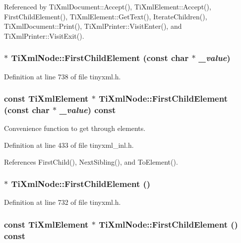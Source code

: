 Referenced by TiXmlDocument::Accept(), TiXmlElement::Accept(), FirstChildElement(), TiXmlElement::GetText(), IterateChildren(), TiXmlDocument::Print(), TiXmlPrinter::VisitEnter(), and TiXmlPrinter::VisitExit().\hypertarget{class_ti_xml_node_a6936ae323675071808ac4840379e57f5}{
\subsubsection[{FirstChildElement}]{$\ast$ TiXmlNode::FirstChildElement (const char $\ast$ {\em \_\-value})}}
\label{class_ti_xml_node_a6936ae323675071808ac4840379e57f5}


Definition at line 738 of file tinyxml.h.\hypertarget{class_ti_xml_node_a0ec361bfef1cf1978d060295f597e0d9}{
\subsubsection[{FirstChildElement}]{\setlength{\rightskip}{0pt plus 5cm}const {\bf TiXmlElement} $\ast$ TiXmlNode::FirstChildElement (const char $\ast$ {\em \_\-value}) const}}
\label{class_ti_xml_node_a0ec361bfef1cf1978d060295f597e0d9}


Convenience function to get through elements. 

Definition at line 433 of file tinyxml\_\-inl.h.

References FirstChild(), NextSibling(), and ToElement().\hypertarget{class_ti_xml_node_aa0fecff1f3866ab33a8a25506e95db1d}{
\subsubsection[{FirstChildElement}]{$\ast$ TiXmlNode::FirstChildElement ()}}
\label{class_ti_xml_node_aa0fecff1f3866ab33a8a25506e95db1d}


Definition at line 732 of file tinyxml.h.\hypertarget{class_ti_xml_node_ab1f8d8e70d88aea4c5efedfe00862d55}{
\subsubsection[{FirstChildElement}]{\setlength{\rightskip}{0pt plus 5cm}const {\bf TiXmlElement} $\ast$ TiXmlNode::FirstChildElement () const}}
\label{class_ti_xml_node_ab1f8d8e70d88aea4c5efedfe00862d55}


